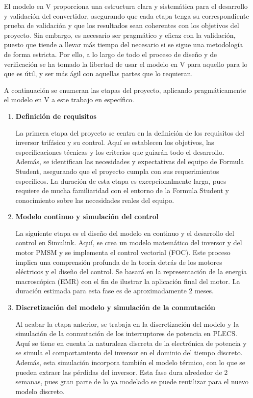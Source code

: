 El modelo en V proporciona una estructura clara y sistemática para el desarrollo y validación del convertidor, asegurando que cada etapa tenga su correspondiente prueba de validación y que los resultados sean coherentes con los objetivos del proyecto. Sin embargo, es necesario ser pragmático y eficaz con la validación, puesto que tiende a llevar más tiempo del necesario si se sigue una metodología de forma estricta. Por ello, a lo largo de todo el proceso de diseño y de verificación se ha tomado la libertad de usar el modelo en V para aquello para lo que es útil, y ser más ágil con aquellas partes que lo requieran.

A continuación se enumeran las etapas del proyecto, aplicando pragmáticamente el modelo en V a este trabajo en específico.
\begin{enumerate}
\item \textbf{Definición de requisitos}

La primera etapa del proyecto se centra en la definición de los requisitos del inversor trifásico y su control. Aquí se establecen los objetivos, las especificaciones técnicas y los criterios que guiarán todo el desarrollo. Además, se identifican las necesidades y expectativas del equipo de Formula Student, asegurando que el proyecto cumpla con sus requerimientos específicos. La duración de esta etapa es excepcionalmente larga, pues requiere de mucha familiaridad con el entorno de la Formula Student y conocimiento sobre las necesidades reales del equipo.

\item \textbf{Modelo continuo y simulación del control}

La siguiente etapa es el diseño del modelo en continuo y el desarrollo del control en Simulink. Aquí, se crea un modelo matemático del inversor y del motor PMSM y se implementa el control vectorial (FOC). Este proceso implica una comprensión profunda de la teoría detrás de los motores eléctricos y el diseño del control. Se basará en la representación de la energía macroscópica (EMR) con el fin de ilustrar la aplicación final del motor. La duración estimada para esta fase es de aproximadamente 2 meses.

\item \textbf{Discretización del modelo y simulación de la conmutación}

Al acabar la etapa anterior, se trabaja en la discretización del modelo y la simulación de la conmutación de los interruptores de potencia en PLECS. Aquí se tiene en cuenta la naturaleza discreta de la electrónica de potencia y se simula el comportamiento del inversor en el dominio del tiempo discreto. Además, esta simulación incorpora también el modelo térmico, con lo que se pueden extraer las pérdidas del inversor. Esta fase dura alrededor de 2 semanas, pues gran parte de lo ya modelado se puede reutilizar para el nuevo modelo discreto.


\end{enumerate}

